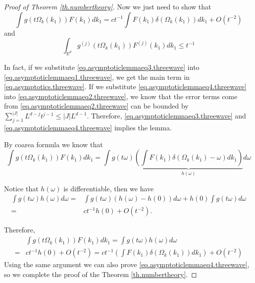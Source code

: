 \begin{proof}[Proof of Theorem \ref{th.numbertheory}]
Now we just need to show that 
\begin{equation}\label{eq.asymptoticlemmaeq3.threewave}
    \int g(t\Omega_k(k_1)) F(k_1) dk_1 =ct^{-1} \int F(k_1) \delta(\Omega_k(k_1)) dk_1+ O(t^{-2})
\end{equation}
and 
\begin{equation}\label{eq.asymptoticlemmaeq4.threewave}
    \int_{\mathbb{R}^d}  g^{(j)}(t\Omega_k(k_1))F^{(j)}(k_1) dk_1 \le t^{-1}
\end{equation}

In fact, if we substitute \eqref{eq.asymptoticlemmaeq3.threewave} into \eqref{eq.asymptoticlemmaeq1.threewave}, we get the main term in \eqref{eq.asymptotics.threewave}. If we substitute \eqref{eq.asymptoticlemmaeq4.threewave} into \eqref{eq.asymptoticlemmaeq2.threewave}, we know that the error terms come from \eqref{eq.asymptoticlemmaeq2.threewave} can be bounded by $\sum^{|J|}_{j=1}L^{d-j}t^{j-1}\le |J| L^{d-1}$. Therefore, \eqref{eq.asymptoticlemmaeq3.threewave} and \eqref{eq.asymptoticlemmaeq4.threewave} implies the lemma.

By coarea formula we know that
\begin{equation}
    \int g(t\Omega_k(k_1)) F(k_1) dk_1 =\int g(t\omega) \underbrace{\left(\int F(k_1) \delta(\Omega_k(k_1)-\omega)dk_1\right) }_{h(\omega)} d\omega 
\end{equation}

Notice that $h(\omega)$ is differentiable, then we have
\begin{equation}
\begin{split}
    \int g(t\omega)h(\omega) d\omega=&\int g(t\omega)(h(\omega)-h(0)) d\omega + h(0)\int g(t\omega)d\omega
    \\
    = &ct^{-1}h(0) +O(t^{-2}). 
\end{split}
\end{equation}

Therefore, 
\begin{equation}
\begin{split}
    &\int g(t\Omega_k(k_1)) F(k_1) dk_1 =\int g(t\omega)h(\omega)  d\omega 
    \\
    =&ct^{-1}h(0) +O(t^{-2})=ct^{-1}\left(\int F(k_1) \delta(\Omega_k(k_1))dk_1\right)  +O(t^{-2})
\end{split}
\end{equation}
Using the same argument we can also prove \eqref{eq.asymptoticlemmaeq4.threewave}, so we complete the proof of the Theorem \ref{th.numbertheory}.
\end{proof}

